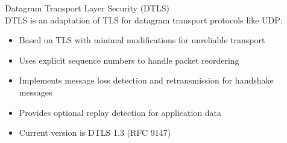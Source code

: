 \begin{definition}{Datagram Transport Layer Security (DTLS)}\\
DTLS is an adaptation of TLS for datagram transport protocols like UDP:
\begin{itemize}
    \item Based on TLS with minimal modifications for unreliable transport
    \item Uses explicit sequence numbers to handle packet reordering
    \item Implements message loss detection and retransmission for handshake messages
    \item Provides optional replay detection for application data
    \item Current version is DTLS 1.3 (RFC 9147)
\end{itemize}
\end{definition}

\multend




